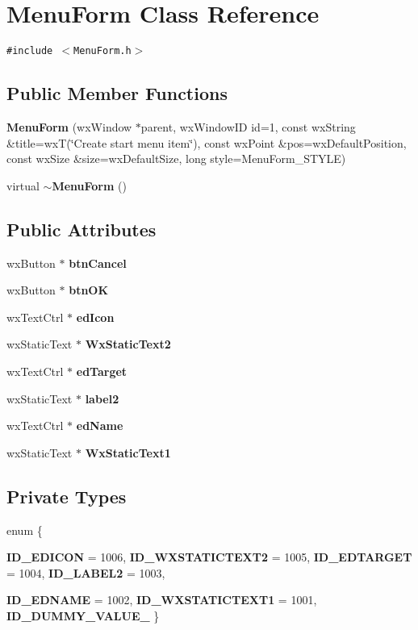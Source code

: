\section{Menu\-Form Class Reference}
\label{class_menu_form}
{\tt \#include $<$Menu\-Form.h$>$}

\subsection*{Public Member Functions}
\begin{CompactItemize}
\item 
{\bf Menu\-Form} (wx\-Window $\ast$parent, wx\-Window\-ID id=1, const wx\-String \&title=wx\-T(\char`\"{}Create start menu item\char`\"{}), const wx\-Point \&pos=wx\-Default\-Position, const wx\-Size \&size=wx\-Default\-Size, long style=Menu\-Form\_\-STYLE)
\item 
virtual {\bf $\sim$Menu\-Form} ()
\end{CompactItemize}
\subsection*{Public Attributes}
\begin{CompactItemize}
\item 
wx\-Button $\ast$ {\bf btn\-Cancel}
\item 
wx\-Button $\ast$ {\bf btn\-OK}
\item 
wx\-Text\-Ctrl $\ast$ {\bf ed\-Icon}
\item 
wx\-Static\-Text $\ast$ {\bf Wx\-Static\-Text2}
\item 
wx\-Text\-Ctrl $\ast$ {\bf ed\-Target}
\item 
wx\-Static\-Text $\ast$ {\bf label2}
\item 
wx\-Text\-Ctrl $\ast$ {\bf ed\-Name}
\item 
wx\-Static\-Text $\ast$ {\bf Wx\-Static\-Text1}
\end{CompactItemize}
\subsection*{Private Types}
\begin{CompactItemize}
\item 
enum \{ \par
{\bf ID\_\-EDICON} =  1006, 
{\bf ID\_\-WXSTATICTEXT2} =  1005, 
{\bf ID\_\-EDTARGET} =  1004, 
{\bf ID\_\-LABEL2} =  1003, 
\par
{\bf ID\_\-EDNAME} =  1002, 
{\bf ID\_\-WXSTATICTEXT1} =  1001, 
{\bf ID\_\-DUMMY\_\-VALUE\_\-}
 \}
\end{CompactItemize}
